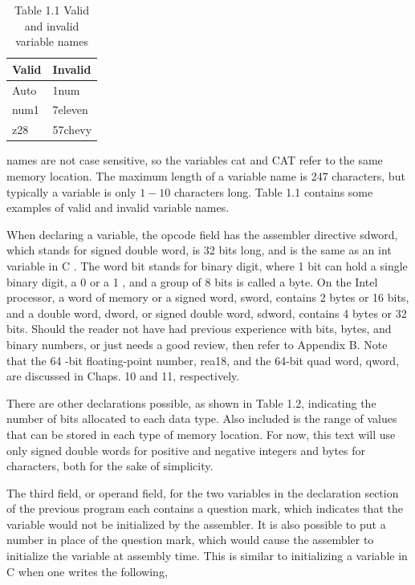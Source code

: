 \documentclass[10pt]{article}
\begin{document}
\begin{table}[h]
\begin{center}
\captionsetup{labelformat=empty}
\caption{Table 1.1 Valid and invalid variable names}
\begin{tabular}{|l|l|}
\hline
Valid & Invalid \\
\hline
Auto & 1num \\
\hline
num1 & 7eleven \\
\hline
z28 & 57chevy \\
\hline
\end{tabular}
\end{center}
\end{table}

names are not case sensitive, so the variables cat and CAT refer to the same memory location. The maximum length of a variable name is 247 characters, but typically a variable is only $1-10$ characters long. Table 1.1 contains some examples of valid and invalid variable names.

When declaring a variable, the opcode field has the assembler directive sdword, which stands for signed double word, is 32 bits long, and is the same as an int variable in C . The word bit stands for binary digit, where 1 bit can hold a single binary digit, a 0 or a 1 , and a group of 8 bits is called a byte. On the Intel processor, a word of memory or a signed word, sword, contains 2 bytes or 16 bits, and a double word, dword, or signed double word, sdword, contains 4 bytes or 32 bits. Should the reader not have had previous experience with bits, bytes, and binary numbers, or just needs a good review, then refer to Appendix B. Note that the 64 -bit floating-point number, rea18, and the 64-bit quad word, qword, are discussed in Chaps. 10 and 11, respectively.

There are other declarations possible, as shown in Table 1.2, indicating the number of bits allocated to each data type. Also included is the range of values that can be stored in each type of memory location. For now, this text will use only signed double words for positive and negative integers and bytes for characters, both for the sake of simplicity.

The third field, or operand field, for the two variables in the declaration section of the previous program each contains a question mark, which indicates that the variable would not be initialized by the assembler. It is also possible to put a number in place of the question mark, which would cause the assembler to initialize the variable at assembly time. This is similar to initializing a variable in C when one writes the following,
\end{document}
